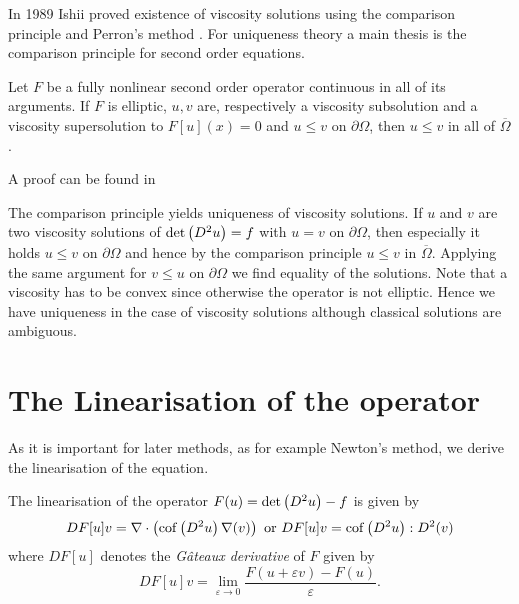 In 1989 Ishii proved existence of viscosity solutions using the comparison principle and Perron's method \cite{Ishii1989}. For uniqueness theory a main thesis is the comparison principle for second order equations.

\begin{theorem}
	Let $F$ be a fully nonlinear second order operator continuous in all of its arguments.
	If $F$ is elliptic,	$u,v$ are, respectively a viscosity subsolution and a viscosity supersolution to $F[u](x)=0$ and $u \leq v$ on $\partial \Omega$, then $u \leq v$ in all of $\overline \Omega$.
\end{theorem}
A proof can be found in \cite[Theorem 17.1]{GT1983}

The comparison principle yields uniqueness of viscosity solutions. If $u$ and $v$ are two viscosity solutions of $\det{\left(D^2 u\right)}=f$ with $u=v$ on $\partial \Omega$, then especially it holds $u \leq v$ on $\partial \Omega$ and hence by the comparison principle $u \leq v$ in  $\overline \Omega$. Applying the same argument for $v \leq u$ on $\partial \Omega$ we find equality of the solutions. Note that a viscosity has to be convex since otherwise the \MA operator is not elliptic. Hence we have uniqueness in the case of viscosity solutions although classical solutions are ambiguous.

\section{The Linearisation of the \MA operator}\label{sec: linearisation}

As it is important for later methods, as for example Newton's method, we derive the linearisation of the \MA equation. 
	\begin{theorem}[Linearisation] \label{thm: linearisation}
		The linearisation of the \MA operator $F(u)=\det{\left(D^2u\right)}-f$ is given by
		\begin{align}
			DF[u]v = \nabla \cdot \left( \operatorname{cof} \left( D^2 u  \right) \nabla (v) \right) \text{ or } DF[u]v=\operatorname{cof} \left( D^2 u \right):D^2 (v)		\end{align}
	where $DF[u]$ denotes the \emph{G\^ateaux derivative} of $F$ given by
	\[
		DF[u]v = \lim\limits_{\varepsilon \rightarrow 0} \frac { F(u+\varepsilon v) - F(u)}\varepsilon.
	\]
	\end{theorem}
		
